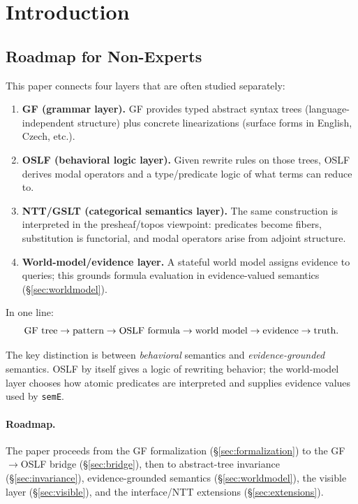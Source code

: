 \documentclass[11pt]{article}
\newcommand{\code}[1]{\texttt{#1}}
\newcommand{\OSLF}{\textup{OSLF}}
\newcommand{\GF}{\textup{GF}}
\newcommand{\NTT}{\textup{NTT}}
\begin{document}
\tableofcontents

\section{Introduction}
\label{sec:intro}

\subsection{Roadmap for Non-Experts}

This paper connects four layers that are often studied separately:

\begin{enumerate}
\item \textbf{\GF{} (grammar layer).}  \GF{} provides typed abstract syntax trees
  (language-independent structure) plus concrete linearizations (surface forms
  in English, Czech, etc.).
\item \textbf{\OSLF{} (behavioral logic layer).}  Given rewrite rules on those
  trees, \OSLF{} derives modal operators and a type/predicate logic of what
  terms can reduce to.
\item \textbf{\NTT{}/GSLT (categorical semantics layer).}  The same construction
  is interpreted in the presheaf/topos viewpoint: predicates become fibers,
  substitution is functorial, and modal operators arise from adjoint structure.
\item \textbf{World-model/evidence layer.}  A stateful world model assigns
  evidence to queries; this grounds formula evaluation in evidence-valued
  semantics (\S\ref{sec:worldmodel}).
\end{enumerate}

In one line:
\[
\text{\GF{} tree} \to \text{pattern} \to \text{\OSLF{} formula}
\to \text{world model} \to \text{evidence} \to \text{truth}.
\]

The key distinction is between \emph{behavioral} semantics and
\emph{evidence-grounded} semantics.  \OSLF{} by itself gives a logic of
rewriting behavior; the world-model layer chooses how atomic predicates are
interpreted and supplies evidence values used by \code{semE}.

\paragraph{Roadmap.}  The paper proceeds from the \GF{} formalization
(\S\ref{sec:formalization}) to the \GF{}$\to$\OSLF{} bridge
(\S\ref{sec:bridge}), then to abstract-tree invariance
(\S\ref{sec:invariance}), evidence-grounded semantics
(\S\ref{sec:worldmodel}), the visible layer (\S\ref{sec:visible}), and
the interface/\NTT{} extensions (\S\ref{sec:extensions}).
\end{document}
